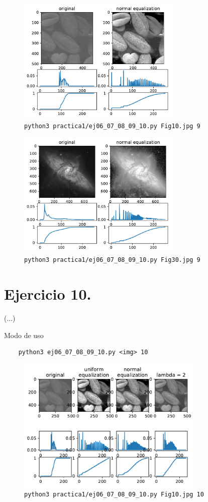 \documentclass[11pt, spanish]{article}
\begin{document}
\begin{figure}[H]
\centering
  \includegraphics[height=6cm]{informe-imgs/ej09-1.pdf}
  \caption{\texttt{python3 practica1/ej06\_07\_08\_09\_10.py Fig10.jpg 9}}
\end{figure}

\begin{figure}[H]
\centering
  \includegraphics[height=6cm]{informe-imgs/ej09-2.pdf}
  \caption{\texttt{python3 practica1/ej06\_07\_08\_09\_10.py Fig30.jpg 9}}
\end{figure}


\section{Ejercicio 10.}
(...)

Modo de uso
\begin{verbatim}
    python3 ej06_07_08_09_10.py <img> 10
\end{verbatim}

\begin{figure}[H]
\centering
  \includegraphics[width=0.8\textwidth]{informe-imgs/ej10-1.pdf}
  \caption{\texttt{python3 practica1/ej06\_07\_08\_09\_10.py Fig10.jpg 10}}
\end{figure}
\end{document}
